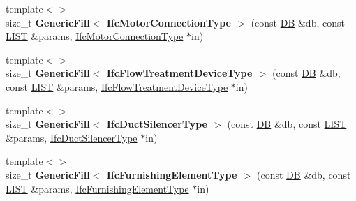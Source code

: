 \begin{DoxyCompactItemize}
\item 
\hypertarget{namespace_assimp_1_1_s_t_e_p_ad30b2987873f40ec33170da7b323bd16}{{\footnotesize template$<$$>$ }\\size\+\_\+t {\bfseries Generic\+Fill$<$ Ifc\+Motor\+Connection\+Type $>$} (const \hyperlink{class_assimp_1_1_s_t_e_p_1_1_d_b}{D\+B} \&db, const \hyperlink{class_assimp_1_1_s_t_e_p_1_1_e_x_p_r_e_s_s_1_1_l_i_s_t}{L\+I\+S\+T} \&params, \hyperlink{struct_assimp_1_1_i_f_c_1_1_ifc_motor_connection_type}{Ifc\+Motor\+Connection\+Type} $\ast$in)}\label{namespace_assimp_1_1_s_t_e_p_ad30b2987873f40ec33170da7b323bd16}

\item 
\hypertarget{namespace_assimp_1_1_s_t_e_p_a96bcc83bcba064f6f9050a2bcc3ee634}{{\footnotesize template$<$$>$ }\\size\+\_\+t {\bfseries Generic\+Fill$<$ Ifc\+Flow\+Treatment\+Device\+Type $>$} (const \hyperlink{class_assimp_1_1_s_t_e_p_1_1_d_b}{D\+B} \&db, const \hyperlink{class_assimp_1_1_s_t_e_p_1_1_e_x_p_r_e_s_s_1_1_l_i_s_t}{L\+I\+S\+T} \&params, \hyperlink{struct_assimp_1_1_i_f_c_1_1_ifc_flow_treatment_device_type}{Ifc\+Flow\+Treatment\+Device\+Type} $\ast$in)}\label{namespace_assimp_1_1_s_t_e_p_a96bcc83bcba064f6f9050a2bcc3ee634}

\item 
\hypertarget{namespace_assimp_1_1_s_t_e_p_a462e7bd60b88d7c82747f1b3714d4b24}{{\footnotesize template$<$$>$ }\\size\+\_\+t {\bfseries Generic\+Fill$<$ Ifc\+Duct\+Silencer\+Type $>$} (const \hyperlink{class_assimp_1_1_s_t_e_p_1_1_d_b}{D\+B} \&db, const \hyperlink{class_assimp_1_1_s_t_e_p_1_1_e_x_p_r_e_s_s_1_1_l_i_s_t}{L\+I\+S\+T} \&params, \hyperlink{struct_assimp_1_1_i_f_c_1_1_ifc_duct_silencer_type}{Ifc\+Duct\+Silencer\+Type} $\ast$in)}\label{namespace_assimp_1_1_s_t_e_p_a462e7bd60b88d7c82747f1b3714d4b24}

\item 
\hypertarget{namespace_assimp_1_1_s_t_e_p_a0740a8c520e5ddc6b1e8ea347a05695b}{{\footnotesize template$<$$>$ }\\size\+\_\+t {\bfseries Generic\+Fill$<$ Ifc\+Furnishing\+Element\+Type $>$} (const \hyperlink{class_assimp_1_1_s_t_e_p_1_1_d_b}{D\+B} \&db, const \hyperlink{class_assimp_1_1_s_t_e_p_1_1_e_x_p_r_e_s_s_1_1_l_i_s_t}{L\+I\+S\+T} \&params, \hyperlink{struct_assimp_1_1_i_f_c_1_1_ifc_furnishing_element_type}{Ifc\+Furnishing\+Element\+Type} $\ast$in)}\label{namespace_assimp_1_1_s_t_e_p_a0740a8c520e5ddc6b1e8ea347a05695b}


\end{DoxyCompactItemize}
